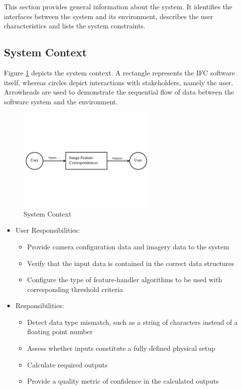 \documentclass[12pt]{article}
\begin{document}
This section provides general information about the system.  It identifies the
interfaces between the system and its environment, describes the user
characteristics and lists the system constraints.

\subsection{System Context}
Figure \ref{Fig_SystemContext} depicts the system context. A rectangle represents 
the IFC software itself, whereas circles depict interactions with stakeholders, 
namely the user. Arrowheads are used to demonstrate the sequential flow of data 
between the software system and the environment.

\begin{figure}[h!]
\begin{center}
 \includegraphics[width=0.6\textwidth]{SystemContextFigure}
\caption{System Context}
\label{Fig_SystemContext} 
\end{center}
\end{figure}

\begin{itemize}
\item User Responsibilities:
\begin{itemize}
\item Provide camera configuration data and imagery data to the system
\item Verify that the input data is contained in the correct data structures
\item Configure the type of feature-handler algorithms to be used with corresponding 
threshold criteria
\end{itemize}
\item \progname{} Responsibilities:
\begin{itemize}
\item Detect data type mismatch, such as a string of characters instead of a
  floating point number
\item Assess whether inputs constitute a fully defined physical setup
\item Calculate required outputs
\item Provide a quality metric of confidence in the calculated outputs
\end{itemize}
\end{itemize}
\end{document}
